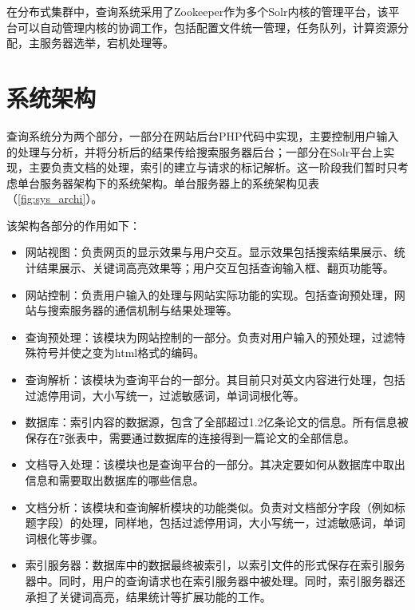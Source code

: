         在分布式集群中，查询系统采用了Zookeeper作为多个Solr内核的管理平台，该平台可以自动管理内核的协调工作，包括配置文件统一管理，任务队列，计算资源分配，主服务器选举，宕机处理等。
    
\section{系统架构}
    查询系统分为两个部分，一部分在网站后台PHP代码中实现，主要控制用户输入的处理与分析，并将分析后的结果传给搜索服务器后台；一部分在Solr平台上实现，主要负责文档的处理，索引的建立与请求的标记解析。这一阶段我们暂时只考虑单台服务器架构下的系统架构。单台服务器上的系统架构见表（\ref{fig:sys_archi}）。

\begin{figure}[!htp]
    \centering
    \resizebox{9cm}{!}{}
\end{figure}

    该架构各部分的作用如下：
    \begin{itemize}
    \item 网站视图：负责网页的显示效果与用户交互。显示效果包括搜索结果展示、统计结果展示、关键词高亮效果等；用户交互包括查询输入框、翻页功能等。
    \item 网站控制：负责用户输入的处理与网站实际功能的实现。包括查询预处理，网站与搜索服务器的通信机制与结果处理等。
    \item 查询预处理：该模块为网站控制的一部分。负责对用户输入的预处理，过滤特殊符号并使之变为html格式的编码。
    \item 查询解析：该模块为查询平台的一部分。其目前只对英文内容进行处理，包括过滤停用词，大小写统一，过滤敏感词，单词词根化等。
    \item 数据库：索引内容的数据源，包含了全部超过1.2亿条论文的信息。所有信息被保存在7张表中，需要通过数据库的连接得到一篇论文的全部信息。
    \item 文档导入处理：该模块也是查询平台的一部分。其决定要如何从数据库中取出信息和需要取出数据库的哪些信息。
    \item 文档分析：该模块和查询解析模块的功能类似。负责对文档部分字段（例如标题字段）的处理，同样地，包括过滤停用词，大小写统一，过滤敏感词，单词词根化等步骤。
    \item 索引服务器：数据库中的数据最终被索引，以索引文件的形式保存在索引服务器中。同时，用户的查询请求也在索引服务器中被处理。同时，索引服务器还承担了关键词高亮，结果统计等扩展功能的工作。
    \end{itemize}

